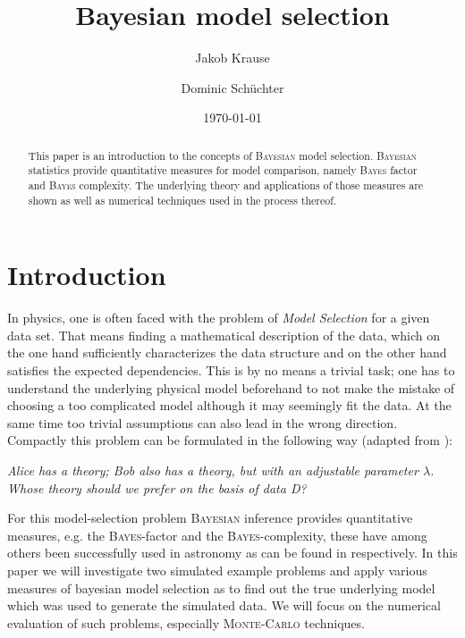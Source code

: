 \documentclass[%
 reprint,
 amsmath,amssymb,
 aps,
]{revtex4-1}
\begin{document}
\title{Bayesian model selection}%

\author{Jakob Krause}
\author{Dominic Schüchter}

\date{\today}%

\begin{abstract}
\noindent This paper is an introduction to the concepts of \textsc{Bayesian} model selection. \textsc{Bayesian} statistics provide quantitative measures for model comparison, namely \textsc{Bayes} factor and \textsc{Bayes} complexity. The underlying theory and applications of those measures are shown as well as numerical techniques used in the process thereof.
\end{abstract}
\maketitle


\section{\label{sec:intro}Introduction}
\noindent In physics, one is often faced with the problem of \emph{Model Selection} for a given data set. That means finding a mathematical description of the data, which on the one hand sufficiently characterizes the data structure and on the other hand satisfies the expected dependencies. This is by no means a trivial task; one has to understand the underlying physical model beforehand to not make the mistake of choosing a too complicated model although it may seemingly fit the data. At the same time too trivial assumptions can also lead in the wrong direction. Compactly this problem can be formulated in the following way (adapted from \cite[Chap. 4]{sivia}):

\begin{center}
	\emph{Alice has a theory; Bob also has a theory, but with an adjustable parameter $\lambda$. Whose theory should we prefer on the basis of data D?}
\end{center}



For this model-selection problem \textsc{Bayesian} inference provides quantitative measures, e.g. the \textsc{Bayes}-factor and the \textsc{Bayes}-complexity, these have among others been successfully used in astronomy as can be found in \cite{trotta,kunz,Trotta_2008} respectively. In this paper we will investigate two simulated example problems and apply various measures of bayesian model selection as to find out the true underlying model which was used to generate the simulated data. We will  focus on the numerical evaluation of such problems, especially\textsc{ Monte-Carlo} techniques.
\end{document}
